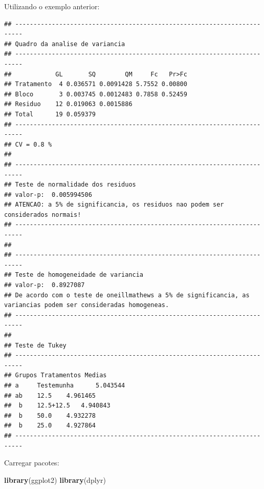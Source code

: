 \documentclass[
]{book}
\newenvironment{Shaded}{\begin{snugshade}}{\end{snugshade}}
\newcommand{\DataTypeTok}[1]{\textcolor[rgb]{0.13,0.29,0.53}{#1}}
\newcommand{\KeywordTok}[1]{\textcolor[rgb]{0.13,0.29,0.53}{\textbf{#1}}}
\newcommand{\NormalTok}[1]{#1}
\newcommand{\OperatorTok}[1]{\textcolor[rgb]{0.81,0.36,0.00}{\textbf{#1}}}
\newcommand{\StringTok}[1]{\textcolor[rgb]{0.31,0.60,0.02}{#1}}
\begin{document}
Utilizando o exemplo anterior:

\begin{Shaded}
\end{Shaded}

\begin{verbatim}
## ------------------------------------------------------------------------
## Quadro da analise de variancia
## ------------------------------------------------------------------------
##            GL       SQ        QM     Fc   Pr>Fc
## Tratamento  4 0.036571 0.0091428 5.7552 0.00800
## Bloco       3 0.003745 0.0012483 0.7858 0.52459
## Residuo    12 0.019063 0.0015886               
## Total      19 0.059379                         
## ------------------------------------------------------------------------
## CV = 0.8 %
## 
## ------------------------------------------------------------------------
## Teste de normalidade dos residuos 
## valor-p:  0.005994506 
## ATENCAO: a 5% de significancia, os residuos nao podem ser considerados normais!
## ------------------------------------------------------------------------
## 
## ------------------------------------------------------------------------
## Teste de homogeneidade de variancia 
## valor-p:  0.8927087 
## De acordo com o teste de oneillmathews a 5% de significancia, as variancias podem ser consideradas homogeneas.
## ------------------------------------------------------------------------
## 
## Teste de Tukey
## ------------------------------------------------------------------------
## Grupos Tratamentos Medias
## a     Testemunha      5.043544 
## ab    12.5    4.961465 
##  b    12.5+12.5   4.940843 
##  b    50.0    4.932278 
##  b    25.0    4.927864 
## ------------------------------------------------------------------------
\end{verbatim}

Carregar pacotes:

\begin{Shaded}
\begin{Highlighting}[]
\KeywordTok{library}\NormalTok{(ggplot2)}
\KeywordTok{library}\NormalTok{(dplyr)}
\end{Highlighting}
\end{Shaded}
\end{document}
